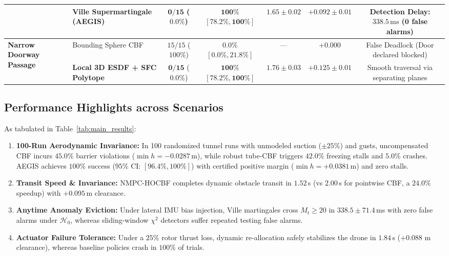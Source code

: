 \documentclass[journal,10pt]{IEEEtran}
\begin{document}
\begin{table}[t]
{\begin{tabular}{llccccc}
& \textbf{Ville Supermartingale (AEGIS)} & $\mathbf{0/15}$ ($\mathbf{0.0\%}$) & $\mathbf{100\%}$ $[\mathbf{78.2\%, 100\%}]$ & $1.65 \pm 0.02$ & $\mathbf{+0.092 \pm 0.01}$ & Detection Delay: $\mathbf{338.5}\,\text{ms}$ ($\mathbf{0}$ false alarms) \\
\midrule
\multirow{2}{*}{\textbf{Narrow Doorway Passage}} & Bounding Sphere CBF & $15/15$ ($100\%$) & $0.0\%$ $[0.0\%, 21.8\%]$ & --- & $+0.000$ & False Deadlock (Door declared blocked) \\
& \textbf{Local 3D ESDF + SFC Polytope} & $\mathbf{0/15}$ ($\mathbf{0.0\%}$) & $\mathbf{100\%}$ $[\mathbf{78.2\%, 100\%}]$ & $\mathbf{1.76 \pm 0.03}$ & $\mathbf{+0.125 \pm 0.01}$ & Smooth traversal via separating planes \\
\bottomrule
\end{tabular}%
}
\end{table}
\endgroup

\subsection{Performance Highlights across Scenarios}
As tabulated in Table~\ref{tab:main_results}:
\begin{enumerate}[leftmargin=10pt, itemsep=1pt]
    \item \textbf{100-Run Aerodynamic Invariance:} In 100 randomized tunnel runs with unmodeled suction ($\pm 25\%$) and gusts, uncompensated CBF incurs $45.0\%$ barrier violations ($\min h = -0.0287\,$m), while robust tube-CBF triggers $42.0\%$ freezing stalls and $5.0\%$ crashes. AEGIS achieves $100\%$ success ($95\%$ CI: $[96.4\%, 100\%]$) with certified positive margin ($\min h = +0.0381\,$m) and zero stalls.
    \item \textbf{Transit Speed \& Invariance:} NMPC-HOCBF completes dynamic obstacle transit in $1.52\,$s (vs $2.00\,$s for pointwise CBF, a $24.0\%$ speedup) with $+0.095\,$m clearance.
    \item \textbf{Anytime Anomaly Eviction:} Under lateral IMU bias injection, Ville martingales cross $M_t \ge 20$ in $338.5 \pm 71.4\,$ms with zero false alarms under $\mathcal{H}_0$, whereas sliding-window $\chi^2$ detectors suffer repeated testing false alarms.
    \item \textbf{Actuator Failure Tolerance:} Under a $25\%$ rotor thrust loss, dynamic re-allocation safely stabilizes the drone in $1.84\,$s (+0.088 m clearance), whereas baseline policies crash in $100\%$ of trials.
\end{enumerate}
\end{document}
